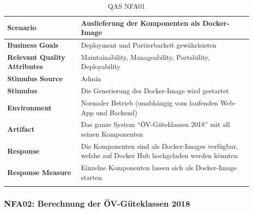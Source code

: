 \begin{longtable}{l p{10.6cm}}
        \toprule
        \textbf{Scenario}
                                & Auslieferung der Komponenten als Docker-Image\\
        \midrule
        \textbf{Business Goals}
                                & Deployment und Portierbarkeit gewährleisten \\
        \textbf{Relevant Quality Attributes}
                                & Maintainability, Manageability, Portability, Deployability\\
        \textbf{Stimulus Source}
                                & Admin\\
        \textbf{Stimulus}
                                & Die Generierung des Docker-Image wird gestartet\\
        \textbf{Environment}
                                & Normaler Betrieb (unabhängig vom laufenden Web-App und Backend)\\
        \textbf{Artifact}
                                & Das ganze System "`ÖV-Güteklassen 2018"' mit all seinen Komponenten\\
        \textbf{Response}
                                & Die Komponenten sind als Docker-Images verfügbar, welche auf Docker Hub hochgeladen werden könnten\\  
        \textbf{Response Measure}
                                & Einzelne Komponenten lassen sich als Docker-Image starten\\
                                  
        \bottomrule
    \caption{QAS NFA01}
    \label{table:nfa01}
\end{longtable}

\subsubsection{NFA02: Berechnung der ÖV-Güteklassen 2018}
\label{NFA:NFA02}

